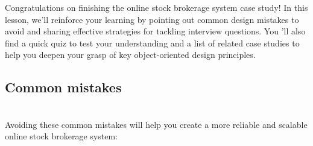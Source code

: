 

Congratulations on finishing the online stock brokerage system case study! In this lesson, we'll reinforce your learning by pointing out common design mistakes to avoid and sharing effective strategies for tackling interview questions. You 'll also find a quick quiz to test your understanding and a list of related case studies to help you deepen your grasp of key object-oriented design principles.

\subsection{Common mistakes}\label{ZSjeWmHDp5z6SDQL1Ls3d}
\\
Avoiding these common mistakes will help you create a more reliable and scalable online stock brokerage system:

